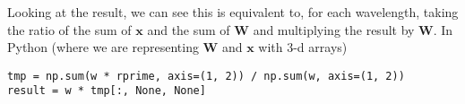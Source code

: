 \documentclass[12pt]{article}
\newcommand{\x}{\mathbf{x}}
\newcommand{\W}{\mathbf{W}}
\begin{document}
\noindent Looking at the result, we can see this is equivalent to, for
each wavelength, taking the ratio of the sum of $\x$ and the sum of $\W$
and multiplying the result by $\W$. In Python (where we are representing $\W$
and $\x$ with 3-d arrays)

\begin{verbatim}
tmp = np.sum(w * rprime, axis=(1, 2)) / np.sum(w, axis=(1, 2))
result = w * tmp[:, None, None]
\end{verbatim}
\end{document}
